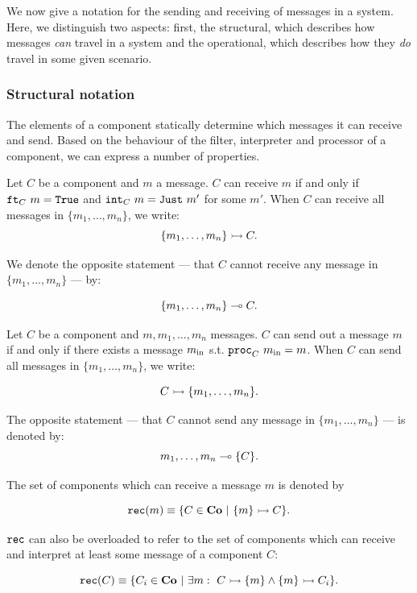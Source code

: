 We now give a notation for the sending and receiving of messages in a system. Here, we distinguish two aspects: first, the structural, which describes how messages {\em can} travel in a system and the operational, which describes how they {\em do} travel in some given scenario.

\subsubsection{Structural notation}

The elements of a component statically determine which messages it can receive and send. Based on the behaviour of the filter, interpreter and processor of a component, we can express a number of properties.

\begin{definition}
	Let $C$ be a component and $m$ a message. $C$ can receive $m$ if and only if $\texttt{ft}_{C}\ m = \mathtt{True}$ and $\texttt{int}_{C}\ m = \mathtt{Just}\ m'$ for some $m'$.
	When $C$ can receive all messages in $\{m_1,\dots,m_n\}$, we write:
	$$
		\{m_1,\dots,m_n\} \rightarrowtail C.
	$$
	
	We denote the opposite statement --- that $C$ cannot receive any message in $\{m_1,\dots,m_n\}$ --- by:
	
	$$
		\{m_1,\dots,m_n\} \multimap C.
	$$
\end{definition}

\begin{definition}
	Let $C$ be a component and $m, m_1,\dots,m_n$ messages. $C$ can send out a message $m$ if and only if there exists a message $m_{\textnormal{in}}$ s.t. $\texttt{proc}_{C}\ m_{\textnormal{in}} = m$.
	When $C$ can send all messages in $\{m_1,\dots,m_n\}$, we write:
	
	$$
		C \rightarrowtail \{m_1,\dots,m_n\}.
	$$
	
	The opposite statement --- that $C$ cannot send any message in $\{m_1,\dots,m_n\}$ --- is denoted by:
	$$
		m_1,\dots,m_n \multimap \{C\}.
	$$
\end{definition}

\begin{definition}
	The set of components which can receive a message $m$ is denoted by
	
	$$
		\rec{m} \equiv \{C \in \co\ |\ \canrec{m}{C} \}.
	$$
	
	$\mathtt{rec}$ can also be overloaded to refer to the set of components which can receive and interpret at least some message of a component $C$:
	
$$
	\mathtt{rec}(C) \equiv \{C_i \in \mathbf{Co}\ |\ \exists m:\ C \rightarrowtail \{m\} \wedge \{m\} \rightarrowtail C_i \}.
$$
\end{definition}


